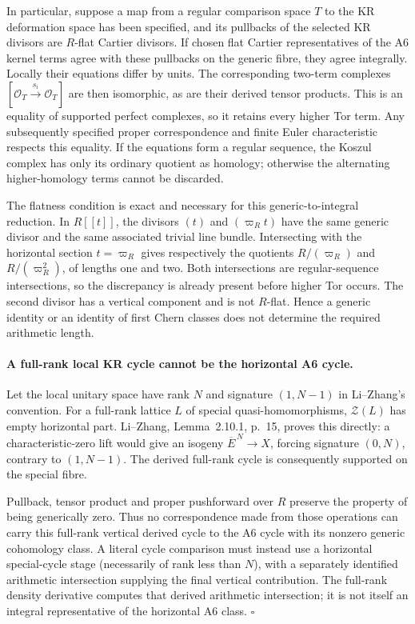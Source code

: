 In particular, suppose a map from a regular comparison space
$T$ to the KR deformation space has been specified, and its
pullbacks of the selected KR divisors are $R$-flat Cartier
divisors.  If chosen flat Cartier representatives of the A6
kernel terms agree with these pullbacks on the generic fibre,
they agree integrally.  Locally their equations differ by units.
The corresponding two-term complexes
$[\mathcal O_T\xrightarrow{s_i}\mathcal O_T]$ are then
isomorphic, as are their derived tensor products.
This is an equality of supported perfect complexes, so it
retains every higher Tor term.
Any subsequently specified proper correspondence and finite
Euler characteristic respects this equality.
If the equations form a regular sequence, the Koszul
complex has only its ordinary quotient as homology; otherwise
the alternating higher-homology terms cannot be discarded.

The flatness condition is exact and necessary for this
generic-to-integral reduction.  In $R[[t]]$, the divisors
$(t)$ and $(\varpi_Rt)$ have the same generic divisor and
the same associated trivial line bundle.
Intersecting with the horizontal section $t=\varpi_R$
gives respectively the quotients $R/(\varpi_R)$ and
$R/(\varpi_R^2)$, of lengths one and two.
Both intersections are regular-sequence intersections, so
the discrepancy is already present before higher Tor occurs.
The second divisor has a vertical component and is not
$R$-flat.  Hence a generic identity or an identity of first
Chern classes does not determine the required arithmetic length.

\paragraph{A full-rank local KR cycle cannot be the horizontal A6 cycle.}
Let the local unitary space have rank $N$ and signature
$(1,N-1)$ in Li--Zhang's convention.
For a full-rank lattice $L$ of special quasi-homomorphisms,
$\mathcal Z(L)$ has empty horizontal part.
Li--Zhang, Lemma~2.10.1, p.~15, proves this directly:
a characteristic-zero lift would give an isogeny
$\overline E^{\,N}\to X$, forcing signature $(0,N)$,
contrary to $(1,N-1)$.
The derived full-rank cycle is consequently supported on
the special fibre.

Pullback, tensor product and proper pushforward over $R$
preserve the property of being generically zero.
Thus no correspondence made from those operations can carry
this full-rank vertical derived cycle to the A6 cycle with
its nonzero generic cohomology class.
A literal cycle comparison must instead use a horizontal
special-cycle stage (necessarily of rank less than $N$),
with a separately identified arithmetic intersection supplying
the final vertical contribution.
The full-rank density derivative computes that derived
arithmetic intersection; it is not itself an integral
representative of the horizontal A6 class.
\hfill$\square$

